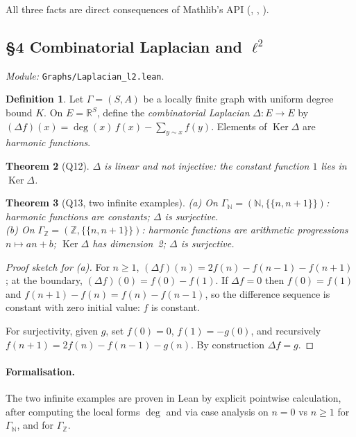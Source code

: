 \documentclass[11pt,a4paper]{article}
\newcommand{\lmod}[1]{\texttt{\small #1}}
\newcommand{\N}{\mathbb{N}}
\newcommand{\Z}{\mathbb{Z}}
\newcommand{\R}{\mathbb{R}}
\newcommand{\Adj}{\sim}
\renewcommand{\deg}{\operatorname{deg}}
\newcommand{\Ker}{\operatorname{Ker}}
\theoremstyle{plain}
\newtheorem{theorem}{Theorem}[section]
\theoremstyle{definition}
\newtheorem{definition}[theorem]{Definition}
\begin{document}
All three facts are direct consequences of Mathlib's
 API (, ,
).

\subsection{\S4 Combinatorial Laplacian and \texorpdfstring{$\ell^2$}{l2}}
\emph{Module:} \lmod{Graphs/Laplacian\_l2.lean}.

\begin{definition}
Let $\Gamma = (S, A)$ be a locally finite graph with uniform degree
bound $K$. On $E = \R^S$, define the \emph{combinatorial Laplacian}
$\Delta : E \to E$ by
$(\Delta f)(x) = \deg(x)\, f(x) - \sum_{y \Adj x} f(y)$.
Elements of $\Ker \Delta$ are \emph{harmonic functions}.
\end{definition}

\begin{theorem}[Q12]
$\Delta$ is linear and not injective: the constant function $1$ lies
in $\Ker \Delta$.
\end{theorem}

\begin{theorem}[Q13, two infinite examples]
(a) On $\Gamma_\N = (\N, \{\{n, n+1\}\})$: harmonic functions are
constants; $\Delta$ is surjective.\\
(b) On $\Gamma_\Z = (\Z, \{\{n, n+1\}\})$: harmonic functions are
arithmetic progressions $n \mapsto an + b$; $\Ker\Delta$ has dimension~2;
$\Delta$ is surjective.
\end{theorem}

\begin{proof}[Proof sketch for (a)]
For $n \geq 1$, $(\Delta f)(n) = 2f(n) - f(n-1) - f(n+1)$; at the
boundary, $(\Delta f)(0) = f(0) - f(1)$. If $\Delta f = 0$ then
$f(0) = f(1)$ and $f(n+1) - f(n) = f(n) - f(n-1)$, so the difference
sequence is constant with zero initial value: $f$ is constant.

For surjectivity, given $g$, set $f(0) = 0$, $f(1) = -g(0)$, and
recursively $f(n+1) = 2f(n) - f(n-1) - g(n)$. By construction
$\Delta f = g$.
\end{proof}

\paragraph{Formalisation.} The two infinite examples are proven in Lean
by explicit pointwise calculation, after computing the local forms
$\deg$ and  via case analysis on $n = 0$ vs $n \geq 1$
for $\Gamma_\N$, and  for $\Gamma_\Z$.
\end{document}
